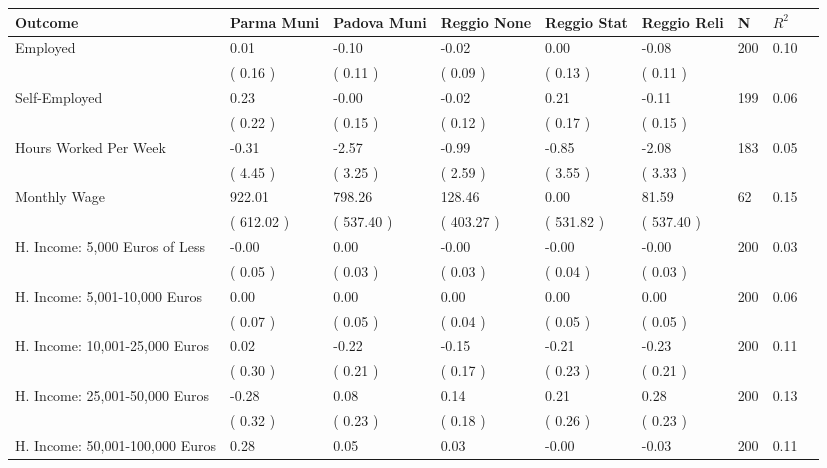 \begin{tabular}{L{6.2cm} C{1.8cm} C{1.8cm} C{1.8cm} C{1.8cm} C{1.8cm} C{1.8cm} C{0.3cm} C{0.3cm}}
\toprule
 \textbf{Outcome} & \textbf{Parma Muni} & \textbf{Padova Muni} & \textbf{Reggio None} & \textbf{Reggio Stat} & \textbf{Reggio Reli} & \textbf{N} & \textbf{$ R^2$} \\
\midrule
Employed &      0.01 &     -0.10 &     -0.02 &      0.00 &     -0.08  & 200 &       0.10 \\ 
 & (     0.16 ) & (     0.11 ) & (     0.09 ) & (     0.13 ) & (     0.11 )  & \\
Self-Employed &      0.23 &     -0.00 &     -0.02 &      0.21 &     -0.11  & 199 &       0.06 \\ 
 & (     0.22 ) & (     0.15 ) & (     0.12 ) & (     0.17 ) & (     0.15 )  & \\
Hours Worked Per Week &     -0.31 &     -2.57 &     -0.99 &     -0.85 &     -2.08  & 183 &       0.05 \\ 
 & (     4.45 ) & (     3.25 ) & (     2.59 ) & (     3.55 ) & (     3.33 )  & \\
Monthly Wage &    922.01 &    798.26 &    128.46 &      0.00 &     81.59  & 62 &       0.15 \\ 
 & (   612.02 ) & (   537.40 ) & (   403.27 ) & (   531.82 ) & (   537.40 )  & \\
H. Income: 5,000 Euros of Less &     -0.00 &      0.00 &     -0.00 &     -0.00 &     -0.00  & 200 &       0.03 \\ 
 & (     0.05 ) & (     0.03 ) & (     0.03 ) & (     0.04 ) & (     0.03 )  & \\
H. Income: 5,001-10,000 Euros &      0.00 &      0.00 &      0.00 &      0.00 &      0.00  & 200 &       0.06 \\ 
 & (     0.07 ) & (     0.05 ) & (     0.04 ) & (     0.05 ) & (     0.05 )  & \\
H. Income: 10,001-25,000 Euros &      0.02 &     -0.22 &     -0.15 &     -0.21 &     -0.23  & 200 &       0.11 \\ 
 & (     0.30 ) & (     0.21 ) & (     0.17 ) & (     0.23 ) & (     0.21 )  & \\
H. Income: 25,001-50,000 Euros &     -0.28 &      0.08 &      0.14 &      0.21 &      0.28  & 200 &       0.13 \\ 
 & (     0.32 ) & (     0.23 ) & (     0.18 ) & (     0.26 ) & (     0.23 )  & \\
H. Income: 50,001-100,000 Euros &      0.28 &      0.05 &      0.03 &     -0.00 &     -0.03  & 200 &       0.11 \\ 

\end{tabular}
